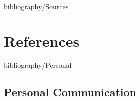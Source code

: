 \documentclass[11pt,a4paper]{article}
\begin{document}


\pagestyle{empty}
\newpage
\clearpage
\mbox{}
\newpage
\clearpage
\thispagestyle{empty}


\clearpage
\thispagestyle{empty}



\pagestyle{empty}

\clearpage
\thispagestyle{empty}

\begin{abstract}

\end{abstract}

\clearpage
\thispagestyle{empty}


\clearpage

\newpage
{}
\pagestyle{fancy}
\setspecialhdr
\tableofcontents

\newpage
\setdefaulthdr
{}	


\clearpage


\begin{btSect}{bibliography/Sources}
\section{References}
\btPrintCited
\end{btSect}
\begin{btSect}{bibliography/Personal}
\subsection*{Personal Communication}
\btPrintCited
\end{btSect}

\setspecialhdr


\clearpage


\clearpage

\appendix
\setdefaulthdr

\end{document}
